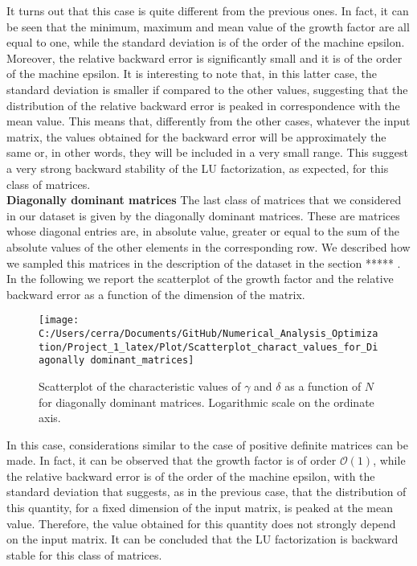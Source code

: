 \documentclass[a4paper,11pt]{report}
\begin{document}
\noindent It turns out that this case is quite different from the previous ones. In fact, it can be seen that the minimum, maximum and mean value of the growth factor are all equal to one, while the standard deviation is of the order of the machine epsilon. Moreover, the relative backward error is significantly small and it is of the order of the machine epsilon. It is interesting to note that, in this latter case, the standard deviation is smaller if compared to the other values, suggesting that the distribution of the relative backward error is peaked in correspondence with the mean value. This means that, differently from the other cases, whatever the input matrix, the values obtained for the backward error will be approximately the same or, in other words, they will be included in a very small range. This suggest a very strong backward stability of the LU factorization, as expected, for this class of matrices.\\

\noindent \textbf{Diagonally dominant matrices } The last class of matrices that we considered in our dataset is given by the diagonally dominant matrices. These are matrices whose diagonal entries are, in absolute value, greater or equal to the sum of the absolute values of the other elements in the corresponding row. We described how we sampled this matrices in the description of the dataset in the section ***** .\\
In the following we report the scatterplot of the growth factor and the relative backward error as a function of the dimension of the matrix.

\begin{figure}[H]
	\centering
	\texttt{[image: C:/Users/cerra/Documents/GitHub/Numerical\_Analysis\_Optimization/Project\_1\_latex/Plot/Scatterplot\_charact\_values\_for\_Diagonally dominant\_matrices]}
	\caption{Scatterplot of the characteristic values of $\gamma$ and $\delta$ as a function of $N$ for diagonally dominant matrices. Logarithmic scale on the ordinate axis.}
	\label{fig:Scatterplot_Diag_dom}
\end{figure}

\noindent In this case, considerations similar to the case of positive definite matrices can be made. In fact, it can be observed that the growth factor is of order $\mathcal{O}(1)$, while the relative backward error is of the order of the machine epsilon, with the standard deviation that suggests, as in the previous case, that the distribution of this quantity, for a fixed dimension of the input matrix, is peaked at the mean value. Therefore, the value obtained for this quantity does not strongly depend on the input matrix. It can be concluded that the LU factorization is backward stable for this class of matrices.
\end{document}
